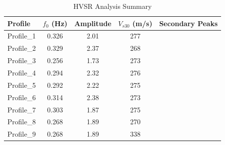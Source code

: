 \begin{table}[htbp]
\centering
\caption{HVSR Analysis Summary}
\begin{tabular}{lcccc}
\hline
Profile & $f_0$ (Hz) & Amplitude & $V_{s30}$ (m/s) & Secondary Peaks \\
\hline
Profile\_1 & 0.326 & 2.01 & 277 &  \\
Profile\_2 & 0.329 & 2.37 & 268 &  \\
Profile\_3 & 0.256 & 1.73 & 273 &  \\
Profile\_4 & 0.294 & 2.32 & 276 &  \\
Profile\_5 & 0.292 & 2.22 & 275 &  \\
Profile\_6 & 0.314 & 2.38 & 273 &  \\
Profile\_7 & 0.303 & 1.87 & 275 &  \\
Profile\_8 & 0.268 & 1.89 & 270 &  \\
Profile\_9 & 0.268 & 1.89 & 338 &  \\
\hline
\end{tabular}
\end{table}
